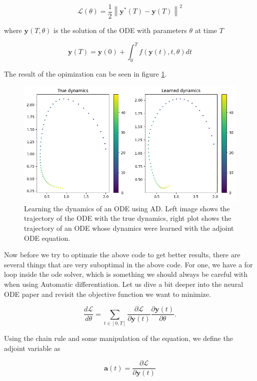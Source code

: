 \documentclass{article}
\begin{document}
{\begin{appendices}
\begin{equation}
\mathcal{L}(\theta) = \frac{1}{2} \left\| \mathbf{y}^*(T) - \mathbf{y}(T) \right\|^2
\end{equation}

where $\mathbf{y}(T, \theta)$ is the solution of the ODE with parameters $\theta$ at time $T$

\begin{equation}
\mathbf{y}(T) = \mathbf{y}(0) + \int_0^T f(\mathbf{y}(t), t, \theta) dt
\end{equation}

The result of the opimization can be seen in figure \ref{fig:ode-ad}.

\begin{figure}[h]
    \centering
    \includegraphics[width=0.75\linewidth]{img/ad.png}
    \caption{Learning the dynamics of an ODE using AD. Left image shows the trajectory of the ODE with the true dynamics, right plot shows the trajectory of an ODE whose dynamics were learned with the adjoint ODE equation.}
    \label{fig:ode-ad}
\end{figure}

Now before we try to optimzie the above code to get better results, there are several things that are very suboptimal in the above code. For one, we have a for loop inside the ode solver, which is something we should always be careful with when using Automatic differentiation. Let us dive a bit deeper into the neural ODE paper and revisit the objective function we want to minimize.

\begin{equation}
\frac{d \mathcal{L}}{d \theta} = \sum_{t \in [0, T]} \frac{\partial \mathcal{L}}{\partial \mathbf{y}(t)} \frac{\partial \mathbf{y}(t)}{\partial \theta}.
\end{equation}

Using the chain rule and some manipulation of the equation, we define the adjoint variable as

\begin{equation}
\mathbf{a}(t) = \frac{\partial \mathcal{L}}{\partial \mathbf{y}(t)}
\end{equation}


\end{appendices}}
\end{document}
